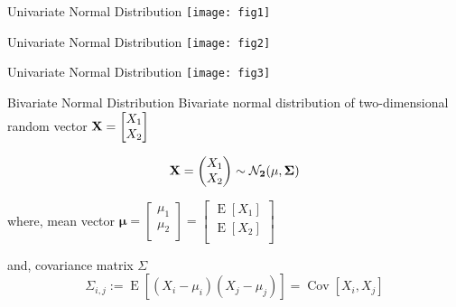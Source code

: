 \documentclass{beamer}
\begin{document}
\begin{frame}{Univariate Normal Distribution}
	\texttt{[image: fig1]} 
\end{frame}

\begin{frame}{Univariate Normal Distribution}
	\texttt{[image: fig2]}
\end{frame}


\begin{frame}{Univariate Normal Distribution}
	\texttt{[image: fig3]}
\end{frame}

\begin{frame}{Bivariate Normal Distribution}
Bivariate normal distribution of two-dimensional random vector $\bf{X} =\begin{bmatrix}
X_{1} \\
X_{2} \\
\end{bmatrix}
$

\begin{gather}
	\bf{X} = \begin{pmatrix}
	X_1 \\
	X_2
	\end{pmatrix} \sim \mathcal{N}_2 (\mu , \Sigma)
\end{gather}

where, mean vector $\bm{\mu} =\begin{bmatrix}
\mu_{1} \\
\mu_{2} \\
\end{bmatrix}
=\begin{bmatrix}
\operatorname{E}[X_{1}] \\
\operatorname{E}[X_{2}] \\
\end{bmatrix}
$

and, covariance matrix $\Sigma$
$$\Sigma_{i,j} := \operatorname{E} [(X_i - \mu_i)( X_j - \mu_j)] = \operatorname{Cov}[X_i, X_j] $$
\end{frame}
\end{document}
